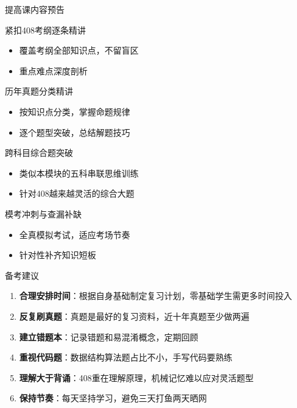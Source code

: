 \documentclass[10pt, aspectratio=169]{beamer}
\begin{document}
\begin{frame}{提高课内容预告}
    \begin{block}{紧扣408考纲逐条精讲}
        \begin{itemize}
            \item 覆盖考纲全部知识点，不留盲区
            \item 重点难点深度剖析
        \end{itemize}
    \end{block}
    \begin{block}{历年真题分类精讲}
        \begin{itemize}
            \item 按知识点分类，掌握命题规律
            \item 逐个题型突破，总结解题技巧
        \end{itemize}
    \end{block}
    \begin{block}{跨科目综合题突破}
        \begin{itemize}
            \item 类似本模块的五科串联思维训练
            \item 针对408越来越灵活的综合大题
        \end{itemize}
    \end{block}
    \begin{block}{模考冲刺与查漏补缺}
        \begin{itemize}
            \item 全真模拟考试，适应考场节奏
            \item 针对性补齐知识短板
        \end{itemize}
    \end{block}
\end{frame}

\begin{frame}{备考建议}
    \begin{enumerate}
        \item \textbf{合理安排时间}：根据自身基础制定复习计划，零基础学生需更多时间投入
        \item \textbf{反复刷真题}：真题是最好的复习资料，近十年真题至少做两遍
        \item \textbf{建立错题本}：记录错题和易混淆概念，定期回顾
        \item \textbf{重视代码题}：数据结构算法题占比不小，手写代码要熟练
        \item \textbf{理解大于背诵}：408重在理解原理，机械记忆难以应对灵活题型
        \item \textbf{保持节奏}：每天坚持学习，避免三天打鱼两天晒网
    \end{enumerate}
\end{frame}
\end{document}
